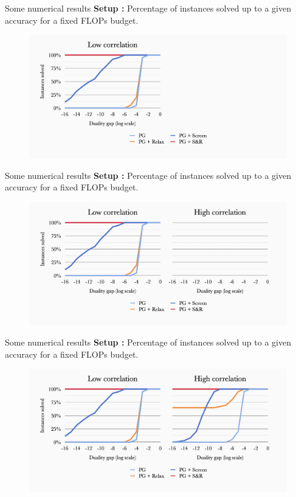 \documentclass[10pt]{beamer}
\begin{document}
\begin{frame}{Some numerical results}
  \textbf{Setup :} Percentage of instances solved up to a given accuracy for a fixed FLOPs budget.
  \begin{figure}
    \includegraphics[width=\linewidth]{img/7.png}
  \end{figure}
\end{frame}

\begin{frame}{Some numerical results}
  \textbf{Setup :} Percentage of instances solved up to a given accuracy for a fixed FLOPs budget.
  \begin{figure}
    \includegraphics[width=\linewidth]{img/8.png}
  \end{figure}
\end{frame}

\begin{frame}{Some numerical results}
  \textbf{Setup :} Percentage of instances solved up to a given accuracy for a fixed FLOPs budget.
  \begin{figure}
    \includegraphics[width=\linewidth]{img/9.png}
  \end{figure}
\end{frame}
\end{document}
